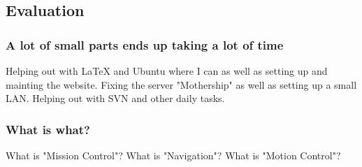 \subsection{Evaluation}\label{first_period_evaluation}
\subsubsection{A lot of small parts ends up taking a lot of time}
Helping out with LaTeX and Ubuntu where I can as well as setting up and
mainting the website. Fixing the server "Mothership" as well as setting up a
small LAN. Helping out with SVN and other daily tasks.

\subsubsection{What is what?}
What is "Mission Control"? What is "Navigation"? What is "Motion Control"?

